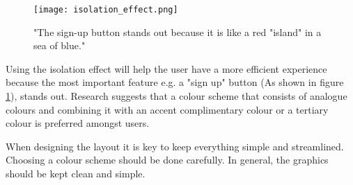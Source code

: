\begin{figure}[H]
\centering
\texttt{[image: isolation\_effect.png]}
\caption{"The sign-up button stands out because it is like a red "island" in a sea of blue." \cite{ColorMeaning}}
\label{isolationFig}
\end{figure}

Using the isolation effect will help the user have a more efficient experience because the most important feature e.g. a "sign up" button (As shown in figure \ref{isolationFig}), stands out. \cite{ColorMeaning} 
Research suggests that a colour scheme that consists of analogue colours and combining it with an accent complimentary colour or a tertiary colour is preferred amongst users. \cite{ColorMeaning} 

When designing the layout it is key to keep everything simple and streamlined. 
Choosing a colour scheme should be done carefully. In general, the graphics should be kept clean and simple.